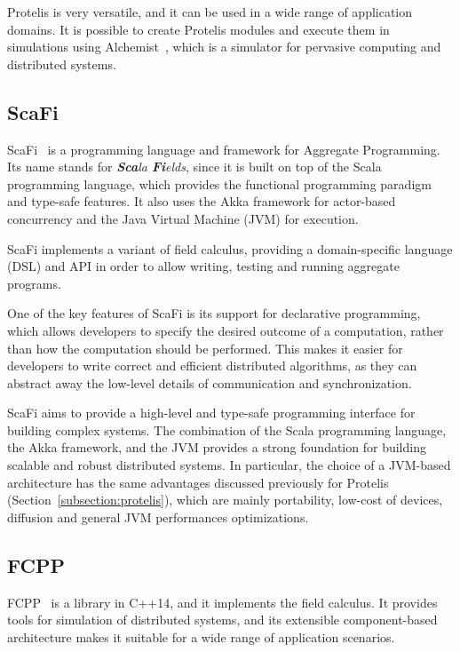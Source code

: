 Protelis is very versatile, and it can be used in a wide range of application domains. It is possible to create Protelis modules and execute them in simulations using Alchemist~\cite{alchemist}, which is a simulator for pervasive computing and distributed systems.

\subsection{ScaFi}\label{subsection:scafi}
ScaFi~\cite{scafi_introduction} is a programming language and framework for Aggregate Programming. Its name stands for \textit{\textbf{Sca}la \textbf{Fi}elds}, since it is built on top of the Scala programming language, which provides the functional programming paradigm and type-safe features. It also uses the Akka framework for actor-based concurrency and the Java Virtual Machine (JVM) for execution.

ScaFi implements a variant of field calculus, providing a domain-specific language (DSL) and API in order to allow writing, testing and running aggregate programs.

One of the key features of ScaFi is its support for declarative programming, which allows developers to specify the desired outcome of a computation, rather than how the computation should be performed. This makes it easier for developers to write correct and efficient distributed algorithms, as they can abstract away the low-level details of communication and synchronization.

ScaFi aims to provide a high-level and type-safe programming interface for building complex systems.\newline
The combination of the Scala programming language, the Akka framework, and the JVM provides a strong foundation for building scalable and robust distributed systems.\newline
In particular, the choice of a JVM-based architecture has the same advantages discussed previously for Protelis (Section~\ref{subsection:protelis}), which are mainly portability, low-cost of devices, diffusion and general JVM performances optimizations.

\subsection{FCPP}\label{subsection:fcpp}
FCPP~\cite{fcpp_introduction} is a library in C++14, and it implements the field calculus.\newline
It provides tools for simulation of distributed systems, and its extensible component-based architecture makes it suitable for a wide range of application scenarios.

